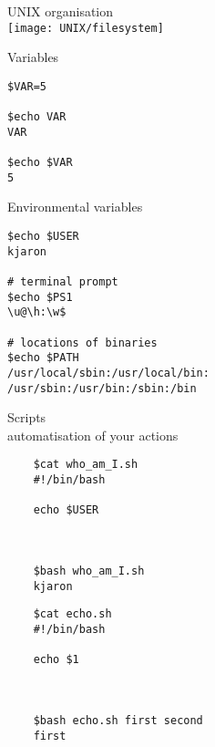 \documentclass[xcolor=dvipsnames]{beamer}
\begin{document}
\begin{frame}
	\begin{center}
		\Huge
		UNIX organisation \\
		\vspace{1cm}
		\texttt{[image: UNIX/filesystem]}
	\end{center}
\end{frame}

\begin{frame}[fragile]
	\begin{center}
		\Huge
		Variables
	\end{center}
\huge
\begin{verbatim}
$VAR=5

$echo VAR
VAR

$echo $VAR
5
\end{verbatim}
\end{frame}

\begin{frame}[fragile]
	\begin{center}
		\Huge
		Environmental variables
	\end{center}
\Large
\begin{verbatim}
$echo $USER
kjaron

# terminal prompt
$echo $PS1
\u@\h:\w$

# locations of binaries
$echo $PATH
/usr/local/sbin:/usr/local/bin:
/usr/sbin:/usr/bin:/sbin:/bin

\end{verbatim}
\end{frame}

\begin{frame}[fragile]
	\begin{center}
		\Huge
		Scripts \\
		\Large
		automatisation of your actions
	\end{center}
\end{frame}

\begin{frame}[fragile]
\LARGE
\begin{verbatim}
	$cat who_am_I.sh
	#!/bin/bash

	echo $USER



	$bash who_am_I.sh
	kjaron
\end{verbatim}
\end{frame}

\begin{frame}[fragile]
\LARGE
\begin{verbatim}
	$cat echo.sh
	#!/bin/bash

	echo $1



	$bash echo.sh first second
	first
\end{verbatim}
\end{frame}
\end{document}
